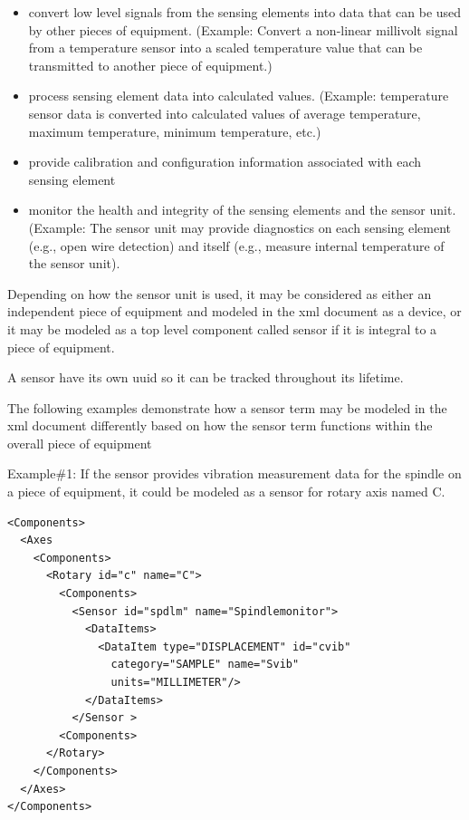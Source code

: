\begin{itemize}
\item convert low level signals from the \glspl{sensing element} into data that can be used by other pieces of equipment.  (Example:  Convert a non-linear millivolt signal from a temperature sensor into a scaled temperature value that can be transmitted to another piece of equipment.)

\item process \gls{sensing element} data into calculated values.  (Example:  temperature sensor data is converted into calculated values of average temperature, maximum temperature, minimum temperature, etc.)

\item provide calibration and configuration information associated with each \gls{sensing element}

\item monitor the health and integrity of the \glspl{sensing element} and the \gls{sensor unit}.  (Example:  The \gls{sensor unit} may provide diagnostics on each \gls{sensing element} (e.g., open wire detection) and itself (e.g., measure internal temperature of the \gls{sensor unit}).
\end{itemize}

Depending on how the \gls{sensor unit} is used, it may be considered as either an independent piece of equipment and modeled in the \gls{xml} document as a \gls{device}, or it may be modeled as a \gls{top level} \gls{component} called \gls{sensor} if it is integral to a piece of equipment.

A \gls{sensor} \may have its own \gls{uuid} so it can be tracked throughout its lifetime.

The following examples demonstrate how a \gls{sensor term} may be modeled in the \gls{xml} document differently based on how the \gls{sensor term} functions within the overall piece of equipment

Example\#1:   If the \gls{sensor} provides vibration measurement data for the spindle on a piece of equipment, it could be modeled as a \gls{sensor} for rotary axis named C.

\begin{lstlisting}[firstnumber=1,escapechar=|,%
    caption={Example of Sensor for rotary axis}, label={lst:example-of-sensor}]
<Components>
  <Axes
    <Components>
      <Rotary id="c" name="C">
        <Components>
          <Sensor id="spdlm" name="Spindlemonitor">
            <DataItems>
              <DataItem type="DISPLACEMENT" id="cvib"
                category="SAMPLE" name="Svib" 
                units="MILLIMETER"/>
            </DataItems>
          </Sensor >
        <Components>
      </Rotary>
    </Components>
  </Axes>
</Components>
\end{lstlisting}

